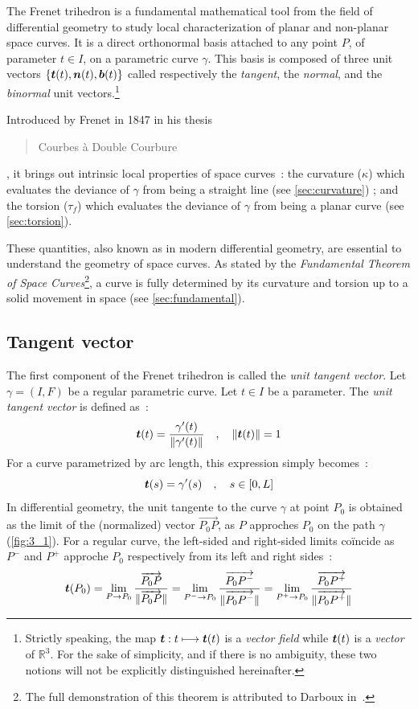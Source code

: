 The Frenet trihedron is a fundamental mathematical tool from the field of differential geometry to study local characterization of planar and non-planar space curves. It is a direct orthonormal basis attached to any point $P$, of parameter $t \in I$, on a parametric curve $\gamma$. This basis is composed of three unit vectors $\{\boldsymbol{t}(t),\boldsymbol{n}(t),\boldsymbol{b}(t)\}$ called respectively the \emph{tangent}, the \emph{normal}, and the \emph{binormal} unit vectors.\footnote{
Strictly speaking, the map $\boldsymbol{t} : t \longmapsto \boldsymbol{t}(t)$ is a \emph{vector field} while $\boldsymbol{t}(t)$ is a \emph{vector} of $\mathbb{R}^3$. For the sake of simplicity, and if there is no ambiguity, these two notions will not be explicitly distinguished hereinafter.}

Introduced by Frenet in 1847 in his thesis \blockcquote[]{Frenet1852}{Courbes à Double Courbure}, it brings out intrinsic local properties of space curves~: the curvature ($\kappa$) which evaluates the deviance of $\gamma$ from being a straight line (see \cref{sec:curvature}) ; and the torsion ($\tau_f$) which evaluates the deviance of $\gamma$ from being a planar curve (see \cref{sec:torsion}).

These quantities, also known as  in modern differential geometry, are essential to understand the geometry of space curves. As stated by the \emph{Fundamental Theorem of Space Curves}\footnote{The full demonstration of this theorem is attributed to Darboux in~\cite[p.11]{Delcourt2007}.}, a curve is fully determined by its curvature and torsion up to a solid movement in space (see \cref{sec:fundamental}).

\subsection{Tangent vector}
The first component of the Frenet trihedron is called the \emph{unit tangent vector}. 
Let $\gamma = (I,F)$ be a regular parametric curve. Let $t \in I$ be a parameter. The \emph{unit tangent vector} is defined as~:
\begin{equation}
	\boldsymbol{t}(t) = \frac{\gamma'(t)}{\lVert\gamma'(t)\rVert}
	\quad,\quad
	\lVert\boldsymbol{t}(t)\rVert=1
\end{equation}
For a curve parametrized by arc length, this expression simply becomes~:
\begin{equation}
	\boldsymbol{t}(s) = \gamma'(s)
	\quad,\quad
	s \in [0,L]
\end{equation}
In differential geometry, the unit tangente to the curve $\gamma$ at point $P_0$ is obtained as the limit of the (normalized) vector $\overrightarrow{P_0 P}$, as $P$ approches $P_0$ on the path $\gamma$ (\cref{fig:3_1}). For a regular curve, the left-sided and right-sided limits coïncide as $P^-$ and $P^+$ approche $P_0$ respectively from its left and right sides~:
\begin{equation}
	\boldsymbol{t}(P_0)
	= \lim_{P \to P_0}\frac{\overrightarrow{P_0 P}}{\lVert\overrightarrow{P_0 P}\rVert}
	= \lim_{P^- \to P_0}\frac{\overrightarrow{P_0 P^-}}{\lVert\overrightarrow{P_0 P^-}\rVert}
	= \lim_{P^+ \to P_0}\frac{\overrightarrow{P_0 P^+}}{\lVert\overrightarrow{P_0 P^+}\rVert}
\label{eq:3_4}
\end{equation}


